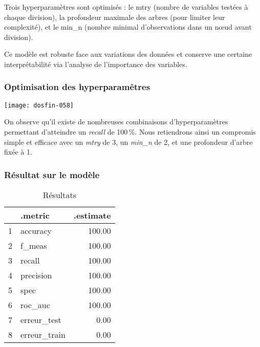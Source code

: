 \documentclass[a4paper,11pt]{article}
\begin{document}
Trois hyperparamètres sont optimisés : le mtry (nombre de variables testées à chaque division), la profondeur maximale des arbres (pour limiter leur complexité), et le min\_n (nombre minimal d'observations dans un nœud avant division).  

Ce modèle est robuste face aux variations des données et conserve une certaine interprétabilité via l’analyse de l’importance des variables.



\subsubsection{Optimisation des hyperparamêtres}



\begin{center}

\texttt{[image: dosfin-058]}

\end{center}

On observe qu’il existe de nombreuses combinaisons d’hyperparamètres permettant d’atteindre un \textit{recall} de 100\,\%.  
Nous retiendrons ainsi un compromis simple et efficace avec un \textit{mtry} de 3, un \textit{min\_n} de 2, et une profondeur d’arbre fixée à 1.



\newpage

\subsubsection{Résultat sur le modèle}

\begin{center}


\begin{table}[ht]
\centering
\begin{tabular}{rlr}
  \hline
 & .metric & .estimate \\ 
  \hline
1 & accuracy & 100.00 \\ 
  2 & f\_meas & 100.00 \\ 
  3 & recall & 100.00 \\ 
  4 & precision & 100.00 \\ 
  5 & spec & 100.00 \\ 
  6 & roc\_auc & 100.00 \\ 
  7 & erreur\_test & 0.00 \\ 
  8 & erreur\_train & 0.00 \\ 
   \hline
\end{tabular}
\caption{Résultats} 
\end{table}
\end{center}
\end{document}
